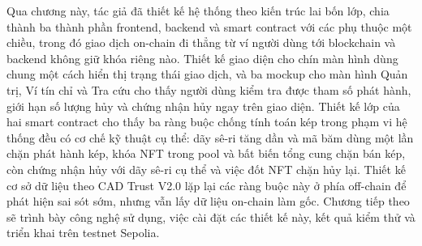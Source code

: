 Qua chương này, tác giả đã thiết kế hệ thống theo kiến trúc lai bốn lớp, chia thành ba thành phần frontend, backend và smart contract với các phụ thuộc một chiều, trong đó giao dịch on-chain đi thẳng từ ví người dùng tới blockchain và backend không giữ khóa riêng nào. Thiết kế giao diện cho chín màn hình dùng chung một cách hiển thị trạng thái giao dịch, và ba mockup cho màn hình Quản trị, Ví tín chỉ và Tra cứu cho thấy người dùng kiểm tra được tham số phát hành, giới hạn số lượng hủy và chứng nhận hủy ngay trên giao diện. Thiết kế lớp của hai smart contract cho thấy ba ràng buộc chống tính toán kép trong phạm vi hệ thống đều có cơ chế kỹ thuật cụ thể: dãy sê-ri tăng dần và mã băm dùng một lần chặn phát hành kép, khóa NFT trong pool và bất biến tổng cung chặn bán kép, còn chứng nhận hủy với dãy sê-ri cụ thể và việc đốt NFT chặn hủy lại. Thiết kế cơ sở dữ liệu theo CAD Trust V2.0 lặp lại các ràng buộc này ở phía off-chain để phát hiện sai sót sớm, nhưng vẫn lấy dữ liệu on-chain làm gốc. Chương tiếp theo sẽ trình bày công nghệ sử dụng, việc cài đặt các thiết kế này, kết quả kiểm thử và triển khai trên testnet Sepolia.
